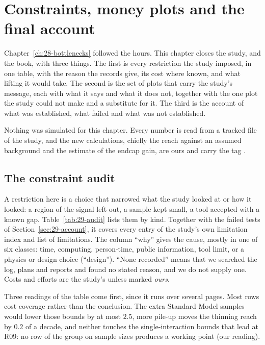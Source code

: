 \chapter{Constraints, money plots and the final account}\label{ch:29-account}

\newcommand{\auditgroup}[1]{\multicolumn{4}{@{}l}{\rule{0pt}{11pt}\textit{#1}}\\*}

Chapter~\ref{ch:28-bottlenecks} followed the hours. This chapter closes the study, and the book, with three things. The first is every restriction the study imposed, in one table, with the reason the records give, its cost where known, and what lifting it would take. The second is the set of plots that carry the study's message, each with what it says and what it does not, together with the one plot the study could not make and a substitute for it. The third is the account of what was established, what failed and what was not established.

Nothing was simulated for this chapter. Every number is read from a tracked file of the study, and the new calculations, chiefly the reach against an assumed background and the estimate of the endcap gain, are ours and carry the tag \EST.

\section{The constraint audit}\label{sec:29-audit}

A restriction here is a choice that narrowed what the study looked at or how it looked: a region of the signal left out, a sample kept small, a tool accepted with a known gap. Table~\ref{tab:29-audit} lists them by kind. Together with the failed tests of Section~\ref{sec:29-account}, it covers every entry of the study's own limitation index and list of limitations. The column ``why'' gives the cause, mostly in one of six classes: time, computing, person-time, public information, tool limit, or a physics or design choice (``design''). ``None recorded'' means that we searched the log, plans and reports and found no stated reason, and we do not supply one. Costs and efforts are the study's unless marked \emph{ours}.

Three readings of the table come first, since it runs over several pages. Most rows cost coverage rather than the conclusion. The extra Standard Model samples would lower those bounds by at most $2.5$, more pile-up moves the thinning reach by $0.2$ of a decade, and neither touches the single-interaction bounds that lead at R09: no row of the group on sample sizes produces a working point (our reading).

